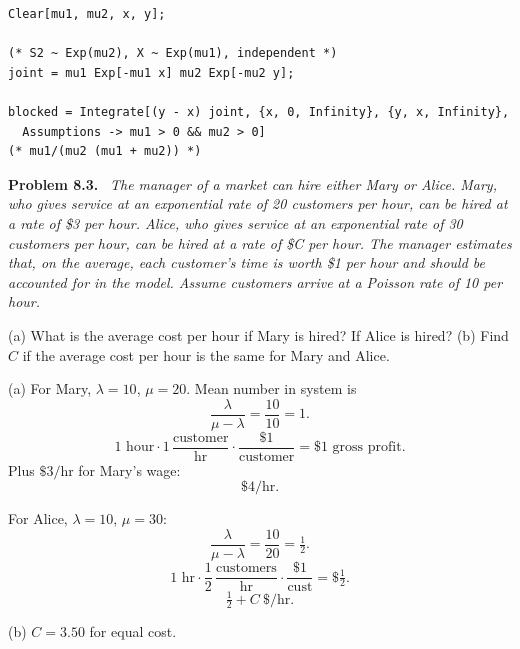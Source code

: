 \documentclass[11pt]{article}
\newenvironment{problem}[1]
  {\par\medskip\noindent\textbf{Problem #1.}\ \itshape}
  {\par\medskip}
\begin{document}
\begin{verbatim}
Clear[mu1, mu2, x, y];

(* S2 ~ Exp(mu2), X ~ Exp(mu1), independent *)
joint = mu1 Exp[-mu1 x] mu2 Exp[-mu2 y];

blocked = Integrate[(y - x) joint, {x, 0, Infinity}, {y, x, Infinity},
  Assumptions -> mu1 > 0 && mu2 > 0]
(* mu1/(mu2 (mu1 + mu2)) *)
\end{verbatim}

\begin{problem}{8.3}
The manager of a market can hire either Mary or Alice. Mary, who gives service at an exponential rate of 20 customers per hour, can be hired at a rate of \$3 per hour. Alice, who gives service at an exponential rate of 30 customers per hour, can be hired at a rate of \$C per hour. The manager estimates that, on the average, each customer's time is worth \$1 per hour and should be accounted for in the model. Assume customers arrive at a Poisson rate of 10 per hour.

(a) What is the average cost per hour if Mary is hired? If Alice is hired?
(b) Find $C$ if the average cost per hour is the same for Mary and Alice.
\end{problem}
(a) For Mary, $\lambda=10$, $\mu=20$. Mean number in system is
$$\frac{\lambda}{\mu-\lambda}=\frac{10}{10}=1.$$
$$1\text{ hour}\cdot 1\,\frac{\text{customer}}{\text{hr}}\cdot \frac{\$1}{\text{customer}}=\$1 \text{ gross profit}.$$
Plus $\$3/\text{hr}$ for Mary's wage:
$$\boxed{\$4/\text{hr}}.$$

For Alice, $\lambda=10$, $\mu=30$:
$$\frac{\lambda}{\mu-\lambda}=\frac{10}{20}=\tfrac12.$$
$$1\text{ hr}\cdot \frac{1}{2}\,\frac{\text{customers}}{\text{hr}}\cdot\frac{\$1}{\text{cust}}=\$\tfrac12.$$
$$\boxed{\tfrac12+C\ \$\text{/hr}}.$$

(b) $C=3.50$ for equal cost.
\end{document}
